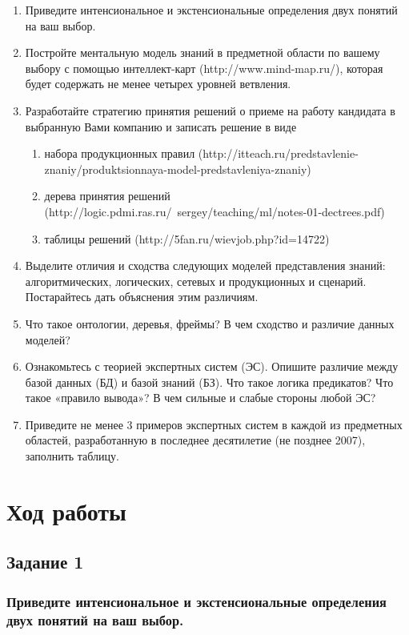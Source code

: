 \documentclass[14pt,a4paper,report]{report}
\begin{document}
\begin{enumerate}
	\item Приведите интенсиональное и экстенсиональные определения двух понятий на ваш выбор.
	\item Постройте ментальную модель знаний в предметной области по вашему выбору с помощью
	интеллект-карт (http://www.mind-map.ru/), которая будет содержать не менее четырех уровней
	ветвления.
	\item Разработайте стратегию принятия решений о приеме на работу кандидата в выбранную Вами
	компанию и записать решение в виде
	\begin{enumerate}
		\item набора продукционных правил (http://itteach.ru/predstavlenie-znaniy/produktsionnaya-model-predstavleniya-znaniy)
		\item дерева принятия решений (http://logic.pdmi.ras.ru/~sergey/teaching/ml/notes-01-dectrees.pdf)
		\item таблицы решений (http://5fan.ru/wievjob.php?id=14722)
	\end{enumerate}
	\item Выделите отличия и сходства следующих моделей представления знаний: алгоритмических,
	логических, сетевых и продукционных и сценарий. Постарайтесь дать объяснения этим различиям.
	\item Что такое онтологии, деревья, фреймы? В чем сходство и различие данных моделей?
	\item Ознакомьтесь с теорией экспертных систем (ЭС). Опишите различие между базой данных (БД) и
	базой знаний (БЗ). Что такое логика предикатов? Что такое «правило вывода»? В чем сильные и
	слабые стороны любой ЭС?
	\item Приведите не менее 3 примеров экспертных систем в каждой из предметных областей,
	разработанную в последнее десятилетие (не позднее 2007), заполнить таблицу.
\end{enumerate}

\clearpage

\section{Ход работы}

\subsection{Задание 1}

\subsubsection{Приведите интенсиональное и экстенсиональные определения двух понятий на ваш выбор.}
\end{document}
